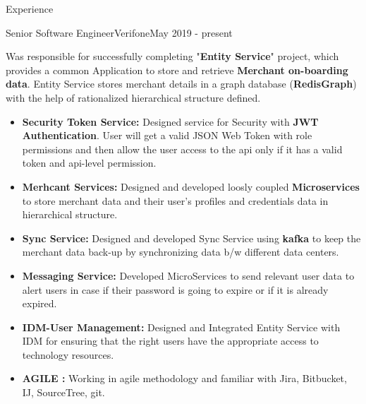\documentclass[]{twentysecondcv}
\begin{document}
\makeheader
\begin{cvsection}{Experience}
    
    
	\begin{cvsubsection}{Senior Software Engineer}{Verifone}{May 2019 - present}
		            
		
		    Was responsible for successfully completing "\textbf{Entity Service}" project, which provides a common Application to store and retrieve \textbf{Merchant on-boarding data}. Entity Service stores merchant details in a graph database (\textbf{RedisGraph}) with the help of rationalized hierarchical structure defined.
    
	\begin{itemize}%
	        \item \textbf{Security Token Service:} Designed service for Security with \textbf{JWT Authentication}. User will get a valid JSON Web Token with role permissions and then allow the user access to the api only if it has a valid token and api-level permission.
		    \item \textbf{Merhcant Services:} Designed and developed loosly coupled \textbf{Microservices} to store merchant data and their user's profiles and credentials data in hierarchical structure.
		     \item \textbf{Sync Service:} Designed and developed Sync Service using \textbf{kafka} to keep the merchant data back-up by synchronizing data b/w different data centers.
		       \item \textbf{Messaging Service:} Developed MicroServices to send relevant user data to alert users in case if their password is going to expire or if it is already expired.
     \item \textbf{IDM-User Management:} Designed and Integrated Entity Service with IDM for ensuring that the right users have the appropriate access to technology resources.
     \item \textbf{AGILE :}  Working in agile methodology and familiar with Jira, Bitbucket, IJ, SourceTree, git.
 

\end{itemize}
\end{cvsubsection}
\end{cvsection}
\end{document}
